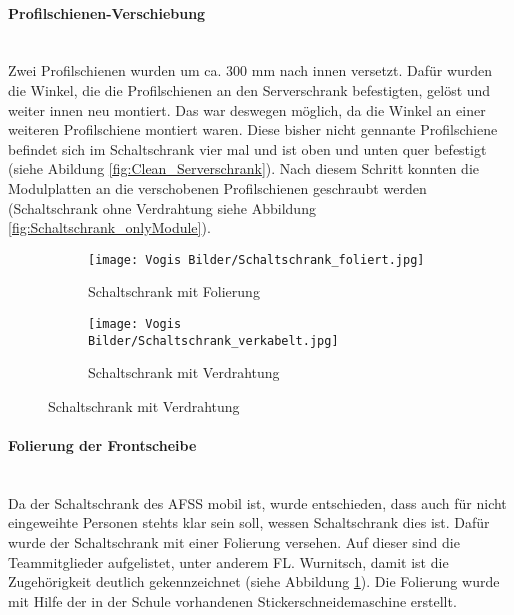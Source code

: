    \paragraph{Profilschienen-Verschiebung}\mbox{}\\
    Zwei Profilschienen wurden um ca. 300 mm nach innen versetzt. Dafür wurden die Winkel, die die Profilschienen an den Serverschrank befestigten, gelöst und weiter innen neu montiert. Das war deswegen möglich, da die Winkel an einer weiteren Profilschiene montiert waren. Diese bisher nicht gennante Profilschiene befindet sich im Schaltschrank vier mal und ist oben und unten quer befestigt (siehe Abildung \ref{fig:Clean_Serverschrank}). Nach diesem Schritt konnten die Modulplatten an die verschobenen Profilschienen geschraubt werden (Schaltschrank ohne Verdrahtung siehe Abbildung \ref{fig:Schaltschrank_onlyModule}).  
    \begin{figure}[H]
        \centering
        \begin{subfigure}{0.45\textwidth}
            \centering
            \texttt{[image: Vogis Bilder/Schaltschrank\_foliert.jpg]}
            \caption{Schaltschrank mit Folierung}
            \label{fig:Schaltschrank_foliert}
        \end{subfigure}
        \hfill
        \begin{subfigure}{0.4\textwidth}
            \centering
            \texttt{[image: Vogis Bilder/Schaltschrank\_verkabelt.jpg]}
            \caption{Schaltschrank mit Verdrahtung}
            \label{fig:Schaltschrank_verkabelt}
        \end{subfigure}
    \end{figure}
    \paragraph{Folierung der Frontscheibe}\mbox{}\\
    Da der Schaltschrank des AFSS mobil ist, wurde entschieden, dass auch für nicht eingeweihte Personen stehts klar sein soll, wessen Schaltschrank dies ist. Dafür wurde der Schaltschrank mit einer Folierung versehen. Auf dieser sind die Teammitglieder aufgelistet, unter anderem FL. Wurnitsch, damit ist die Zugehörigkeit deutlich gekennzeichnet (siehe Abbildung \ref{fig:Schaltschrank_foliert}). Die Folierung wurde mit Hilfe der in der Schule vorhandenen Stickerschneidemaschine erstellt.
